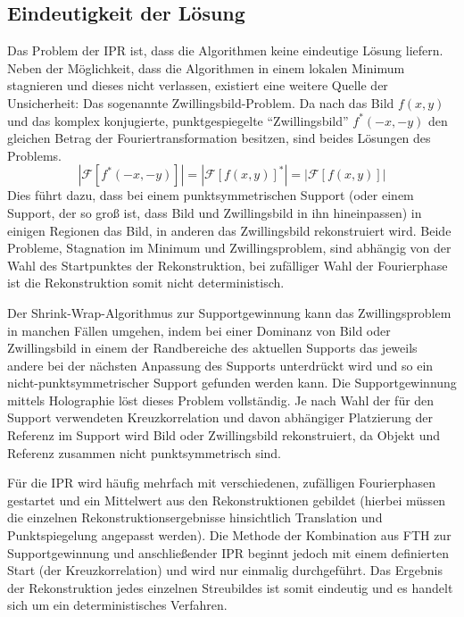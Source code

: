 \subsection{Eindeutigkeit der Lösung}
Das Problem der IPR ist, dass die Algorithmen keine eindeutige Lösung liefern. Neben der Möglichkeit, dass die Algorithmen in einem lokalen Minimum stagnieren und dieses nicht verlassen, existiert eine weitere Quelle der Unsicherheit: Das sogenannte Zwillingsbild-Problem. Da nach  das Bild $f(x,y)$ und das komplex konjugierte, punktgespiegelte "`Zwillingsbild"'  $f^*(-x,-y)$ den gleichen Betrag der Fouriertransformation besitzen, sind beides Lösungen des Problems.
\begin{equation}
	\label{eq:zwilling}
	\left|\mathscr{F}[f^*(-x,-y)]\right|=\left|\mathscr{F}[f(x,y)]^*\right|=\left|\mathscr{F}[f(x,y)]\right|
\end{equation}
Dies führt dazu, dass bei einem punktsymmetrischen Support (oder einem Support, der so groß ist, dass Bild und Zwillingsbild in ihn hineinpassen) in einigen Regionen das Bild, in anderen das Zwillingsbild rekonstruiert wird. Beide Probleme, Stagnation im Minimum und Zwillingsproblem, sind abhängig von der Wahl des Startpunktes der Rekonstruktion, bei zufälliger Wahl der Fourierphase ist die Rekonstruktion somit nicht deterministisch.

Der Shrink-Wrap-Algorithmus zur Supportgewinnung kann das Zwillingsproblem in manchen Fällen umgehen, indem bei einer Dominanz von Bild oder Zwillingsbild in einem der Randbereiche des aktuellen Supports das jeweils andere bei der nächsten Anpassung des Supports unterdrückt wird und so ein nicht-punktsymmetrischer Support gefunden werden kann.
Die Supportgewinnung mittels Holographie löst dieses Problem vollständig. Je nach Wahl der für den Support verwendeten Kreuzkorrelation und davon abhängiger Platzierung der Referenz im Support wird Bild oder Zwillingsbild rekonstruiert, da Objekt und Referenz zusammen nicht punktsymmetrisch sind.

Für die IPR wird häufig mehrfach mit verschiedenen, zufälligen Fourierphasen gestartet und ein Mittelwert aus den Rekonstruktionen gebildet (hierbei müssen die einzelnen Rekonstruktionsergebnisse hinsichtlich Translation und Punktspiegelung angepasst werden). Die Methode der Kombination aus FTH zur Supportgewinnung und anschließender IPR beginnt jedoch mit einem definierten Start (der Kreuzkorrelation) und wird nur einmalig durchgeführt. Das Ergebnis der Rekonstruktion jedes einzelnen Streubildes ist somit eindeutig und es handelt sich um ein deterministisches Verfahren.

